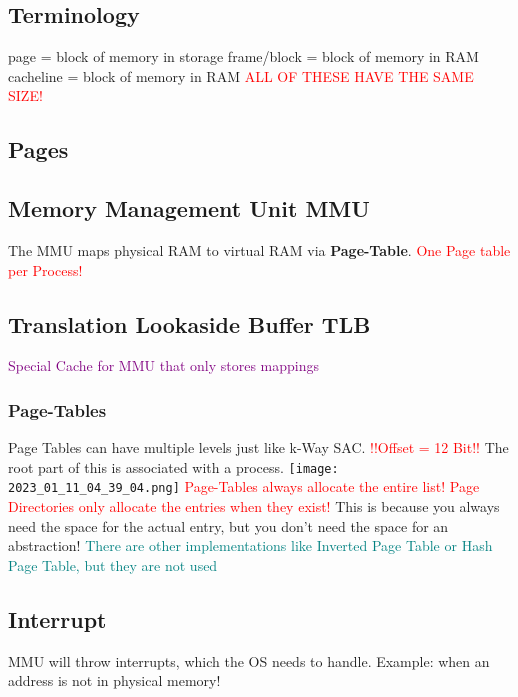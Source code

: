 \documentclass[main.tex,fontsize=8pt,paper=a4,paper=landscape,DIV=calc,]{scrartcl}
\begin{document}
\begin{multicols*}{4}
\subsection{Terminology}
page = block of memory in storage
frame/block = block of memory in RAM
cacheline = block of memory in RAM
\textcolor{red}{ALL OF THESE HAVE THE SAME SIZE!}

\subsection{Pages}

\subsection{Memory Management Unit MMU}
The MMU maps physical RAM to virtual RAM via \textbf{Page-Table}.\newline
\textcolor{red}{One Page table per Process!}

\subsection{Translation Lookaside Buffer TLB}
\textcolor{purple}{Special Cache for MMU that only stores mappings}

\subsubsection{Page-Tables}
Page Tables can have multiple levels just like k-Way SAC. \textcolor{red}{!!Offset = 12 Bit!!}\newline
The root part of this is associated with a process.\newline
\texttt{[image: 2023\_01\_11\_04\_39\_04.png]}\newline
\textcolor{red}{Page-Tables always allocate the entire list! Page Directories only allocate the entries when they exist!}\newline
This is because you always need the space for the actual entry, but you don't need the space for an abstraction!
\textcolor{teal}{There are other implementations like Inverted Page Table or Hash Page Table, but they are not used}

\subsection{Interrupt}
MMU will throw interrupts, which the OS needs to handle.\newline
Example: when an address is not in physical memory!\newline


\end{multicols*}
\end{document}

